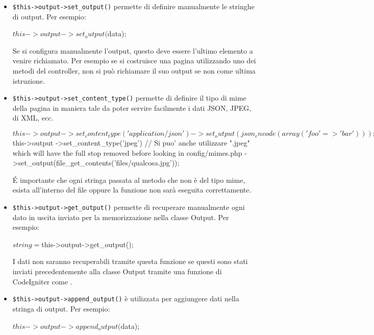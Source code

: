 \begin{itemize}
\item \verb|$this->output->set_output()| permette di definire manualmente le stringhe di output. Per esempio:

\begin{code}
$this->output->set_output($data);
\end{code}

Se si configura manualmente l'output, questo deve essere l'ultimo elemento a venire richiamato. Per esempio se si costruisce una pagina utilizzando uno dei metodi del controller, non si può richiamare il suo output se non come ultima istruzione.

\item \verb|$this->output->set_content_type()| permette di definire il tipo di mime della pagina in maniera tale da poter servire facilmente i dati JSON, JPEG, di XML, ecc.

\begin{code}
$this->output
    ->set_content_type('application/json')
    ->set_output(json_encode(array('foo' => 'bar')));

$this->output
    ->set_content_type('jpeg') // Si puo' anche utilizzare ".jpeg" which will have the full stop removed before looking in config/mimes.php
    ->set_output(file_get_contents('files/qualcosa.jpg'));
\end{code}

\'E importante che ogni stringa passata al metodo che non è del tipo mime, esista all'interno del file  oppure la funzione non sarà eseguita correttamente.

\item \verb|$this->output->get_output()| permette di recuperare manualmente ogni dato in uscita inviato per la memorizzazione nella classe Output. Per esempio:

\begin{code}
$string = $this->output->get_output();
\end{code}

I dati non saranno recuperabili tramite questa funzione se questi sono stati inviati precedentemente alla classe Output tramite una funzione di CodeIgniter come .

\item \verb|$this->output->append_output()| è utilizzata per aggiungere dati nella stringa di output. Per esempio:

\begin{code}
$this->output->append_output($data);
\end{code}


\end{itemize}

